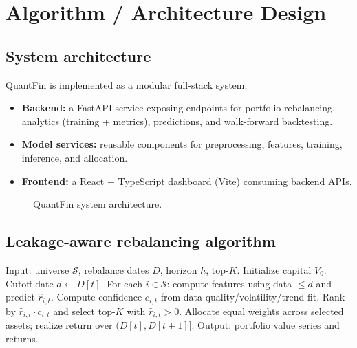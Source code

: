 \documentclass[conference]{IEEEtran}
\begin{document}
\section{Algorithm / Architecture Design}\label{sec:arch}
\subsection{System architecture}
QuantFin is implemented as a modular full-stack system:
\begin{itemize}
\item \textbf{Backend:} a FastAPI service exposing endpoints for portfolio rebalancing, analytics (training + metrics), predictions, and walk-forward backtesting.
\item \textbf{Model services:} reusable components for preprocessing, features, training, inference, and allocation.
\item \textbf{Frontend:} a React + TypeScript dashboard (Vite) consuming backend APIs.
\end{itemize}

\begin{figure}[!t]
\begin{center}
\caption{QuantFin system architecture.}
\label{fig:arch}
\end{center}
\end{figure}

\subsection{Leakage-aware rebalancing algorithm}
\begin{algorithm}
\caption{Leakage-aware monthly rebalancing (simplified)}
\label{alg:rebalance}
\begin{algorithmic}
\STATE Input: universe $\mathcal{S}$, rebalance dates $D$, horizon $h$, top-$K$.
\STATE Initialize capital $V_0$.
\STATE Cutoff date $d \leftarrow D[t]$.
\STATE For each $i \in \mathcal{S}$: compute features using data $\le d$ and predict $\widehat{r}_{i,t}$.
\STATE Compute confidence $c_{i,t}$ from data quality/volatility/trend fit.
\STATE Rank by $\widehat{r}_{i,t} \cdot c_{i,t}$ and select top-$K$ with $\widehat{r}_{i,t} > 0$.
\STATE Allocate equal weights across selected assets; realize return over $(D[t], D[t+1]]$.
\ENDFOR
\STATE Output: portfolio value series and returns.
\end{algorithmic}
\end{algorithm}
\end{document}
